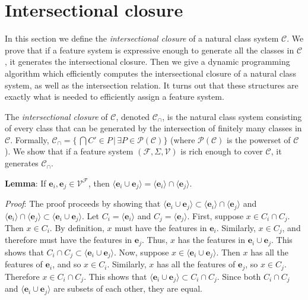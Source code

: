 \documentclass[11pt, oneside]{article}   	%
\begin{document}
\section{Intersectional closure}

In this section we define the \textit{intersectional closure} of a natural class system $\mathcal C$. We prove that if a feature system is expressive enough to generate all the classes in $\mathcal C$, it generates the intersectional closure. Then we give a dynamic programming algorithm which efficiently computes the intersectional closure of a natural class system, as well as the intersection relation. It turns out that these structures are exactly what is needed to efficiently assign a feature system.

\vspace{\baselineskip} The \textit{intersectional closure} of $\mathcal C$, denoted $\mathcal C_\cap$, is the natural class system consisting of every class that can be generated by the intersection of finitely many classes in $\mathcal C$. Formally, $\mathcal C_\cap = \{\, \bigcap {C' \in P}  \, | \, \exists P \in \mathcal P(\mathcal C) \}$ (where $\mathcal P(\mathcal C)$ is the powerset of $\mathcal C$). We show that if a feature system $(\mathcal F, \Sigma, \mathcal V)$ is rich enough to cover $\mathcal C$, it generates $\mathcal C_\cap$.

\vspace{\baselineskip} \noindent \textbf{Lemma}: If $\mathbf{e}_i, \mathbf{e}_j \in \mathcal V^\mathcal F$, then $\langle \mathbf{e}_i \cup \mathbf{e}_j \rangle =  \langle \mathbf{e}_i \rangle \cap \langle \mathbf{e}_j \rangle$.

\textit{Proof}: The proof proceeds by showing that $\langle \mathbf{e}_i \cup \mathbf{e}_j \rangle \subset  \langle \mathbf{e}_i \rangle \cap \langle \mathbf{e}_j \rangle$ and $ \langle \mathbf{e}_i \rangle \cap \langle \mathbf{e}_j \rangle \subset \langle \mathbf{e}_i \cup \mathbf{e}_j \rangle$.
Let $C_i = \langle \mathbf{e}_i \rangle$ and $C_j = \langle \mathbf{e}_j \rangle$.
First, suppose $x \in C_i \cap C_j$. Then $x \in C_i$. By definition, $x$ must have the features in $\mathbf{e}_i$.
Similarly, $x \in C_j$, and therefore must have the features in $\mathbf{e}_j$.
Thus, $x$ has the features in $\mathbf{e}_i \cup \mathbf{e}_j$. This shows that $C_i \cap C_j \subset \langle \mathbf{e}_i \cup \mathbf{e}_j \rangle$.
Now, suppose $x \in \langle \mathbf{e}_i \cup \mathbf{e}_j \rangle$. Then $x$ has all the features of $\mathbf{e}_i$, and so $x \in C_i$.
Similarly, $x$ has all the features of $\mathbf{e}_j$, so $x \in C_j$. Therefore $x \in C_i \cap C_j$. This shows that $\langle \mathbf{e}_i \cup \mathbf{e}_j \rangle \subset C_i \cap C_j$.
Since both $C_i \cap C_j$ and $\langle \mathbf{e}_i \cup \mathbf{e}_j \rangle$ are subsets of each other, they are equal.
\end{document}
